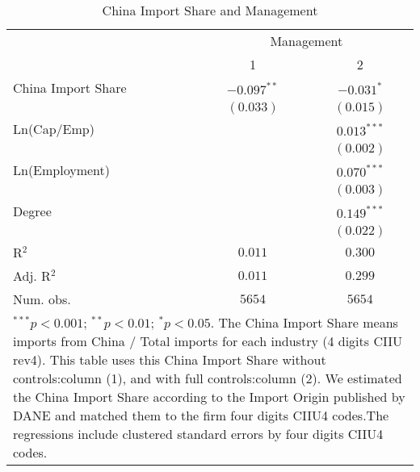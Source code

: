 \documentclass{article}
\begin{document}
\begin{table}
\caption{China Import Share and Management}
\begin{center}
\begin{normalsize}
\begin{tabular}{l c c}
\hline
 & \multicolumn{2}{c}{Management} \\
\cline{2-3}
 & 1 & 2 \\
\hline
China Import Share & $-0.097^{**}$ & $-0.031^{*}$  \\
                   & $(0.033)$     & $(0.015)$     \\
Ln(Cap/Emp)        &               & $0.013^{***}$ \\
                   &               & $(0.002)$     \\
Ln(Employment)     &               & $0.070^{***}$ \\
                   &               & $(0.003)$     \\
Degree             &               & $0.149^{***}$ \\
                   &               & $(0.022)$     \\
\hline
R$^2$              & $0.011$       & $0.300$       \\
Adj. R$^2$         & $0.011$       & $0.299$       \\
Num. obs.          & $5654$        & $5654$        \\
\hline
\multicolumn{3}{l}{\scriptsize{\parbox{0.9\linewidth}{\vspace{3pt}$^{***}p<0.001$; $^{**}p<0.01$; $^{*}p<0.05$. \\The China Import Share means imports from China / Total imports for each industry (4 digits CIIU rev4). This table uses this China Import Share without controls:column (1), and with full controls:column (2). We estimated the China Import Share according to the Import Origin published by DANE and matched them to the firm four digits CIIU4 codes.The regressions include clustered standard errors by four digits CIIU4 codes.}}}
\end{tabular}
\end{normalsize}
\label{table:coefficients}
\end{center}
\end{table}
\end{document}
